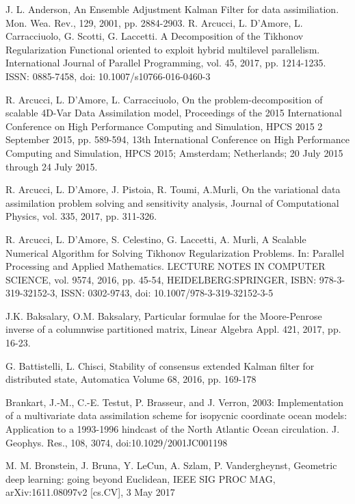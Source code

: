 \documentclass[smallcondensed]{svjour3}
\begin{document}
\begin{thebibliography}{99}
 J. L. Anderson, An Ensemble Adjustment Kalman Filter for data assimiliation.
Mon. Wea. Rev., 129, 2001, pp. 2884-2903.
 R. Arcucci, L.  D'Amore, L. Carracciuolo, G. Scotti, G. Laccetti. A Decomposition of the Tikhonov Regularization Functional oriented to exploit hybrid multilevel parallelism. International  Journal of Parallel Programming, vol. 45, 2017, pp. 1214-1235.  ISSN: 0885-7458, doi: 10.1007/s10766-016-0460-3


 R. Arcucci, L.  D'Amore,  L. Carracciuolo, On the problem-decomposition of scalable 4D-Var Data Assimilation model, Proceedings of the 2015 International Conference on High Performance Computing and Simulation, HPCS 2015
2 September 2015,  pp. 589-594, 13th International Conference on High Performance Computing and Simulation, HPCS 2015; Amsterdam; Netherlands; 20 July 2015 through 24 July 2015.

 R. Arcucci, L. D'Amore, J. Pistoia, R. Toumi, A.Murli, On the variational data assimilation problem solving and sensitivity analysis, Journal of Computational Physics, vol. 335, 2017, pp. 311-326. 

 R. Arcucci, L. D'Amore, S. Celestino, G.  Laccetti, A. Murli,  A Scalable Numerical Algorithm for Solving Tikhonov Regularization Problems. In: Parallel Processing and Applied Mathematics. LECTURE NOTES IN COMPUTER SCIENCE, vol. 9574, 2016,  pp. 45-54, HEIDELBERG:SPRINGER, ISBN: 978-3-319-32152-3, ISSN: 0302-9743, doi: 10.1007/978-3-319-32152-3-5


J.K. Baksalary,  O.M. Baksalary, Particular formulae for the Moore-Penrose inverse of a columnwise partitioned matrix, Linear Algebra Appl. 421, 2017, pp. 16-23.

 G. Battistelli, L. Chisci,  Stability of consensus extended Kalman filter for distributed state, Automatica
Volume 68, 2016, pp. 169-178

 Brankart, J.-M., C.-E. Testut, P. Brasseur, and J. Verron, 2003: Implementation of a multivariate data assimilation scheme for isopycnic coordinate ocean models: Application to a 1993-1996 hindcast of the North Atlantic Ocean circulation. J. Geophys. Res., 108, 3074, doi:10.1029/2001JC001198

 M. M. Bronstein, J. Bruna, Y. LeCun, A. Szlam, P. Vandergheynst, Geometric deep learning:
going beyond Euclidean, IEEE SIG PROC MAG, arXiv:1611.08097v2 [cs.CV],  3 May 2017



\end{thebibliography}
\end{document}
